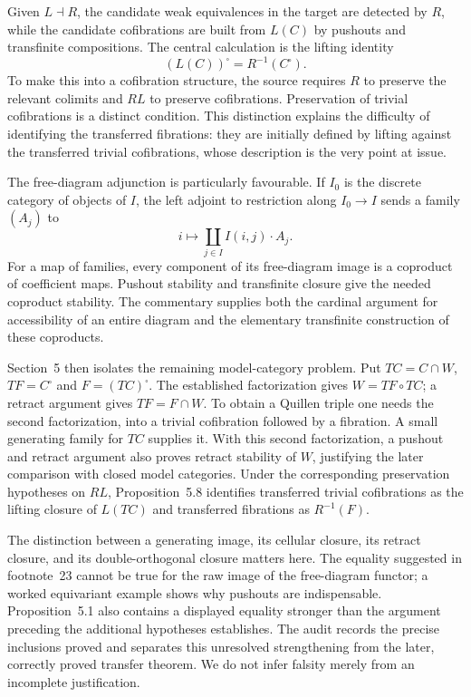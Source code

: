 Given $L\dashv R$, the candidate weak equivalences in the target are detected by $R$, while the candidate cofibrations are built from $L(C)$ by pushouts and transfinite compositions. The central calculation is the lifting identity
\[
 (L(C))^{\square}=R^{-1}(C^{\square}).
\]
To make this into a cofibration structure, the source requires $R$ to preserve the relevant colimits and $RL$ to preserve cofibrations. Preservation of trivial cofibrations is a distinct condition. This distinction explains the difficulty of identifying the transferred fibrations: they are initially defined by lifting against the transferred trivial cofibrations, whose description is the very point at issue.

The free-diagram adjunction is particularly favourable. If $I_0$ is the discrete category of objects of $I$, the left adjoint to restriction along $I_0\to I$ sends a family $(A_j)$ to
\[
 i\longmapsto\coprod_{j\in I} I(i,j)\cdot A_j.
\]
For a map of families, every component of its free-diagram image is a coproduct of coefficient maps. Pushout stability and transfinite closure give the needed coproduct stability. The commentary supplies both the cardinal argument for accessibility of an entire diagram and the elementary transfinite construction of these coproducts.

Section~5 then isolates the remaining model-category problem. Put $TC=C\cap W$, $TF=C^{\square}$ and $F=(TC)^{\square}$. The established factorization gives $W=TF\circ TC$; a retract argument gives $TF=F\cap W$. To obtain a Quillen triple one needs the second factorization, into a trivial cofibration followed by a fibration. A small generating family for $TC$ supplies it. With this second factorization, a pushout and retract argument also proves retract stability of $W$, justifying the later comparison with closed model categories. Under the corresponding preservation hypotheses on $RL$, Proposition~5.8 identifies transferred trivial cofibrations as the lifting closure of $L(TC)$ and transferred fibrations as $R^{-1}(F)$.

The distinction between a generating image, its cellular closure, its retract closure, and its double-orthogonal closure matters here. The equality suggested in footnote~23 cannot be true for the raw image of the free-diagram functor; a worked equivariant example shows why pushouts are indispensable. Proposition~5.1 also contains a displayed equality stronger than the argument preceding the additional hypotheses establishes. The audit records the precise inclusions proved and separates this unresolved strengthening from the later, correctly proved transfer theorem. We do not infer falsity merely from an incomplete justification.

